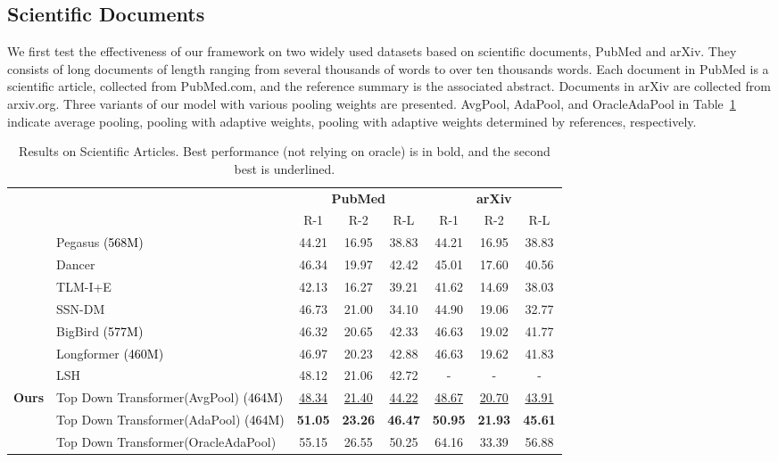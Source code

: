 \documentclass{article} \usepackage{iclr2022_conference,times}
\newcommand{\todof}{{Top Down Transformer}\xspace} \newcommand{\todofull}{{Top Down Transformer}\xspace} \newcommand\todo[1]{\textcolor{red}{(#1)}}
\begin{document}
\subsection{Scientific Documents}
We first test the effectiveness of our framework on two widely used datasets based on scientific documents, PubMed and arXiv. They consists of long documents of length ranging from several thousands of words to over ten thousands words. Each document in PubMed is a scientific article, collected from PubMed.com, and the reference summary is the associated abstract. Documents in arXiv are collected from arxiv.org. Three variants of our model with various pooling weights are presented. AvgPool, AdaPool, and OracleAdaPool in Table~\ref{table:pubmed} indicate average pooling, pooling with adaptive weights, pooling with adaptive weights determined by references, respectively. 


\begin{table}[h!]
\small
\centering
\begin{tabular}{c l c c c c c c} 
\toprule
& & \multicolumn{3}{c}{\textbf{PubMed}} & \multicolumn{3}{c}{\textbf{arXiv}}\\
& & R-1 & R-2 & R-L & R-1 & R-2 & R-L\\
\hline
&Pegasus \textcolor{black}{(568M)} & 44.21 & 16.95 & 38.83 & 44.21 & 16.95 & 38.83 \\ 
&Dancer & 46.34 & 19.97 & 42.42 & 45.01 & 17.60 & 40.56\\ \cline{2-8} 
&TLM-I+E & 42.13 & 16.27 & 39.21 & 41.62 & 14.69 & 38.03\\ 
&SSN-DM & 46.73 & 21.00 & 34.10 & 44.90 & 19.06 & 32.77\\ \cline{2-8}
&BigBird \textcolor{black}{(577M)} & 46.32 & 20.65 & 42.33 & 46.63 & 19.02 & 41.77\\ 
&Longformer \textcolor{black}{(460M)} & 46.97 & 20.23 & 42.88 & 46.63 & 19.62 & 41.83\\ 
&LSH & 48.12 & 21.06 & 42.72 & - & - & -\\ 
\hline
\multirow{3}{*}{\bf Ours} & \todof (AvgPool) \textcolor{black}{(464M)} & \underline{48.34} & \underline{21.40} & \underline{44.22} & \underline{48.67} & \underline{20.70} & \underline{43.91}\\ 
    & \todof (AdaPool) \textcolor{black}{(464M)} & \textbf{51.05} & \textbf{23.26} & \textbf{46.47} & \textbf{50.95} & \textbf{21.93} & \textbf{45.61}\\ \cline{2-8}
    & \todof (OracleAdaPool) & 55.15 & 26.55 & 50.25 & 64.16 & 33.39 & 56.88\\ 
\hline
\end{tabular}
\caption{\scriptsize Results on Scientific Articles. Best performance (not relying on oracle) is in bold, and the second best is underlined.}
\label{table:pubmed}
\end{table}
\end{document}
